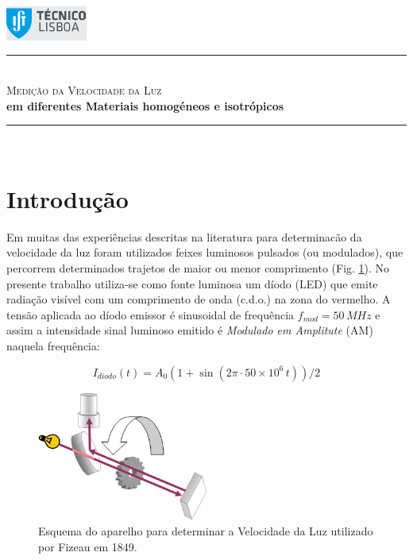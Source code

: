 \documentclass[a4paper,12pt]{article}      %
\author{Prof. Bernardo B. Carvalho}
\date{ Outubro 2012}
\newcommand{\HRule}{\rule{\linewidth}{0.5mm}}
\begin{document}
 

	\includegraphics[width=0.2\textwidth]{../logo-ist}%

	\HRule \\[0.5cm]
	{ \huge \sf  \textsc{Medição da Velocidade da Luz} }\\[0.4cm] %
	{ \large \bfseries em diferentes Materiais homogéneos e isotrópicos}\\
	\HRule \\%


\section{\sf Introdução}
Em muitas das experiências descritas na literatura para
determinacão da velocidade da luz foram utilizados feixes luminosos
pulsados (ou modulados), que percorrem determinados trajetos de maior ou menor
comprimento (Fig. \ref{fig:Fizeau}). 
No presente trabalho utiliza-se como fonte luminosa um díodo (LED) que
emite radiação  visível com um comprimento de onda (c.d.o.) na
zona do vermelho. A tensão aplicada ao díodo emissor é 
sinusoidal de frequência $f_{mod}=50\,MHz$ e  assim a intensidade sinal luminoso
 emitido é \emph{Modulado em Amplitute} (AM) naquela frequência: 

\begin{equation*}
	\label{eq:f_am}
		I_{diodo}(t) = A_0 (1+ \sin ( 2\pi \cdot 50\times 10^6 \, t))/2
\end{equation*}

\begin{figure}
	[ht!b]  \centering 
	\includegraphics[width=0.5\textwidth]{Fizeau}
	\caption{Esquema do aparelho para determinar a Velocidade da Luz utilizado por Fizeau em 1849. \label{fig:Fizeau}} 
\end{figure}
\end{document}
